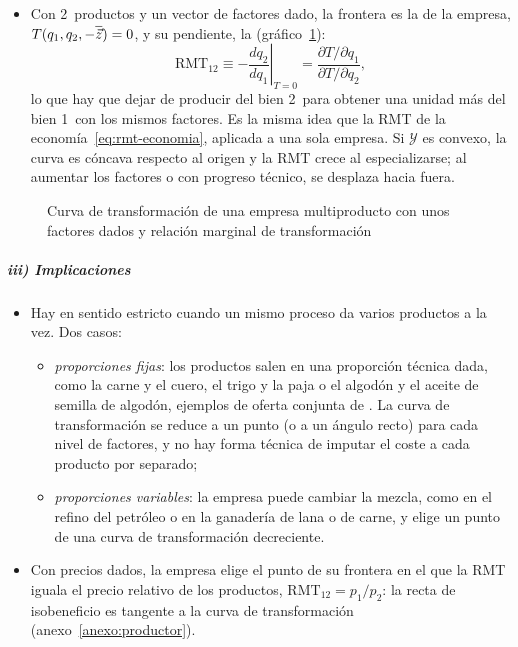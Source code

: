 \documentclass[11pt]{article}
\begin{document}
\begin{itemize}
\item Con 2~productos y un vector de factores dado, la frontera es la  de la empresa, $T(q_1,q_2,-\overline{\vec{z}})=0$, y su pendiente, la  (gráfico~\ref{fig:transformacion-empresa}):
  \begin{equation}
  \mathrm{RMT}_{12}\equiv-\left.\frac{dq_2}{dq_1}\right|_{T=0}=\frac{\partial T/\partial q_1}{\partial T/\partial q_2}, \label{eq:rmt-empresa}
  \end{equation}
  lo que hay que dejar de producir del bien 2~para obtener una unidad más del bien 1~con los mismos factores. Es la misma idea que la RMT de la economía~\eqref{eq:rmt-economia}, aplicada a una sola empresa. Si $\mathcal{Y}$ es convexo, la curva es cóncava respecto al origen y la RMT crece al especializarse; al aumentar los factores o con progreso técnico, se desplaza hacia fuera.
\end{itemize}

\begin{figure}[H]
\centering
\caption{Curva de transformación de una empresa multiproducto con unos factores dados y relación marginal de transformación}\label{fig:transformacion-empresa}
\end{figure}

\subparagraph{iii) Implicaciones}

\begin{itemize}
\item Hay  en sentido estricto cuando un mismo proceso da varios productos a la vez. Dos casos:
  \begin{itemize}
  \item \emph{proporciones fijas}: los productos salen en una proporción técnica dada, como la carne y el cuero, el trigo y la paja o el algodón y el aceite de semilla de algodón, ejemplos de oferta conjunta de \textcite[libro~V, cap.~VI]{Marshall1890Principles}. La curva de transformación se reduce a un punto (o a un ángulo recto) para cada nivel de factores, y no hay forma técnica de imputar el coste a cada producto por separado;
  \item \emph{proporciones variables}: la empresa puede cambiar la mezcla, como en el refino del petróleo o en la ganadería de lana o de carne, y elige un punto de una curva de transformación decreciente.
  \end{itemize}
\item Con precios dados, la empresa elige el punto de su frontera en el que la RMT iguala el precio relativo de los productos, $\mathrm{RMT}_{12}=p_1/p_2$: la recta de isobeneficio es tangente a la curva de transformación (anexo~\ref{anexo:productor}).
\end{itemize}
\end{document}
